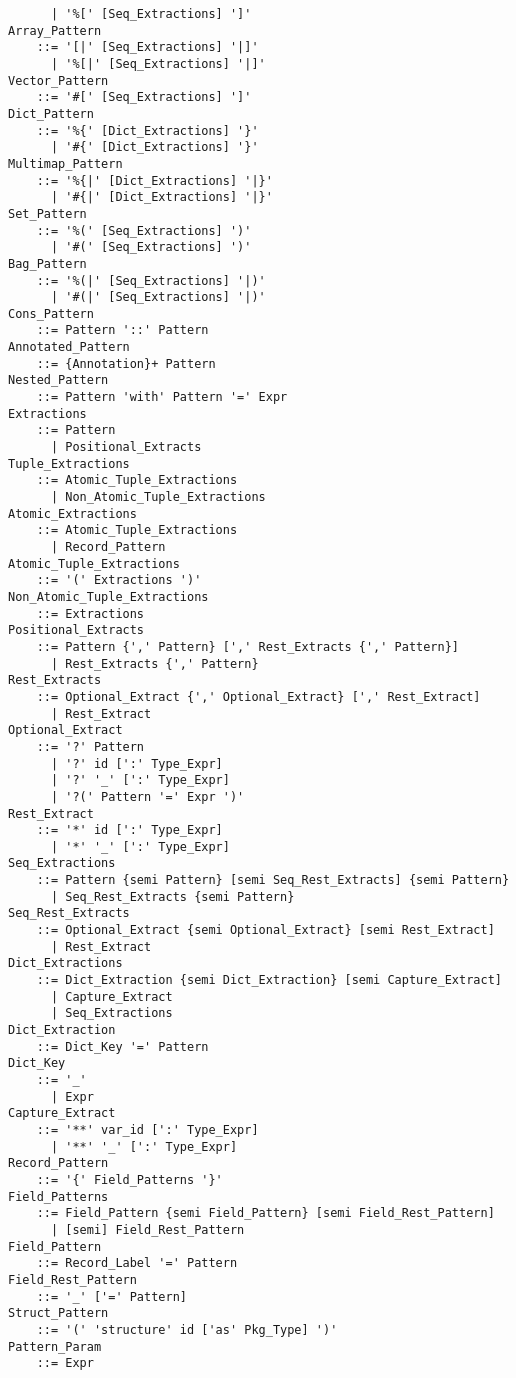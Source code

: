 \begin{lstlisting}
      | '%[' [Seq_Extractions] ']'
Array_Pattern
    ::= '[|' [Seq_Extractions] '|]'
      | '%[|' [Seq_Extractions] '|]'
Vector_Pattern
    ::= '#[' [Seq_Extractions] ']'
Dict_Pattern 
    ::= '%{' [Dict_Extractions] '}'
      | '#{' [Dict_Extractions] '}'
Multimap_Pattern 
    ::= '%{|' [Dict_Extractions] '|}'
      | '#{|' [Dict_Extractions] '|}'
Set_Pattern
    ::= '%(' [Seq_Extractions] ')'
      | '#(' [Seq_Extractions] ')'
Bag_Pattern
    ::= '%(|' [Seq_Extractions] '|)'
      | '#(|' [Seq_Extractions] '|)'
Cons_Pattern 
    ::= Pattern '::' Pattern
Annotated_Pattern 
    ::= {Annotation}+ Pattern
Nested_Pattern
    ::= Pattern 'with' Pattern '=' Expr
Extractions
    ::= Pattern 
      | Positional_Extracts
Tuple_Extractions 
    ::= Atomic_Tuple_Extractions
      | Non_Atomic_Tuple_Extractions
Atomic_Extractions
    ::= Atomic_Tuple_Extractions
      | Record_Pattern
Atomic_Tuple_Extractions 
    ::= '(' Extractions ')'
Non_Atomic_Tuple_Extractions 
    ::= Extractions
Positional_Extracts 
    ::= Pattern {',' Pattern} [',' Rest_Extracts {',' Pattern}]
      | Rest_Extracts {',' Pattern}
Rest_Extracts
    ::= Optional_Extract {',' Optional_Extract} [',' Rest_Extract]
      | Rest_Extract
Optional_Extract 
    ::= '?' Pattern
      | '?' id [':' Type_Expr]
      | '?' '_' [':' Type_Expr]
      | '?(' Pattern '=' Expr ')'
Rest_Extract 
    ::= '*' id [':' Type_Expr]
      | '*' '_' [':' Type_Expr]
Seq_Extractions
    ::= Pattern {semi Pattern} [semi Seq_Rest_Extracts] {semi Pattern}
      | Seq_Rest_Extracts {semi Pattern}
Seq_Rest_Extracts 
    ::= Optional_Extract {semi Optional_Extract} [semi Rest_Extract]
      | Rest_Extract
Dict_Extractions 
    ::= Dict_Extraction {semi Dict_Extraction} [semi Capture_Extract]
      | Capture_Extract
      | Seq_Extractions
Dict_Extraction
    ::= Dict_Key '=' Pattern
Dict_Key 
    ::= '_'
      | Expr
Capture_Extract 
    ::= '**' var_id [':' Type_Expr]
      | '**' '_' [':' Type_Expr]
Record_Pattern 
    ::= '{' Field_Patterns '}'
Field_Patterns 
    ::= Field_Pattern {semi Field_Pattern} [semi Field_Rest_Pattern]
      | [semi] Field_Rest_Pattern
Field_Pattern 
    ::= Record_Label '=' Pattern
Field_Rest_Pattern
    ::= '_' ['=' Pattern]
Struct_Pattern
    ::= '(' 'structure' id ['as' Pkg_Type] ')'
Pattern_Param 
    ::= Expr
\end{lstlisting}

